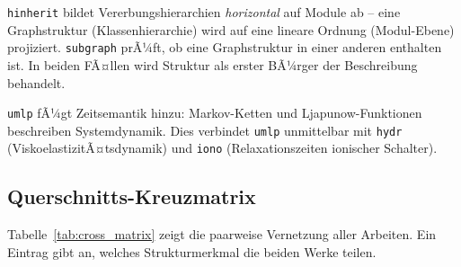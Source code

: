 ﻿\documentclass[a4paper,12pt]{scrreprt}
\theoremstyle{definition}
\begin{document}
\texttt{hinherit} bildet Vererbungshierarchien \emph{horizontal} auf Module
ab -- eine Graphstruktur (Klassenhierarchie) wird auf eine lineare Ordnung
(Modul-Ebene) projiziert. \texttt{subgraph} prÃ¼ft, ob eine Graphstruktur
in einer anderen enthalten ist. In beiden FÃ¤llen wird Struktur als erster
BÃ¼rger der Beschreibung behandelt.

\texttt{umlp} fÃ¼gt Zeitsemantik hinzu: Markov-Ketten und Ljapunow-Funktionen
beschreiben Systemdynamik. Dies verbindet \texttt{umlp} unmittelbar mit
\texttt{hydr} (ViskoelastizitÃ¤tsdynamik) und \texttt{iono} (Relaxationszeiten
ionischer Schalter).

\subsection{Querschnitts-Kreuzmatrix}

Tabelle~\ref{tab:cross_matrix} zeigt die paarweise Vernetzung aller Arbeiten.
Ein Eintrag gibt an, welches Strukturmerkmal die beiden Werke teilen.
\end{document}
